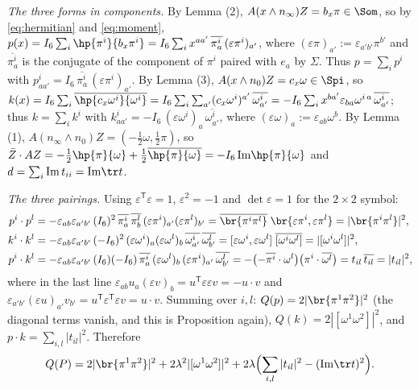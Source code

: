 \emph{The three forms in components.} By Lemma (2), $A(x\wedge n_{\infty})Z = b_{x}\pi \in \Som$, so by \eqref{eq:hermitian} and \eqref{eq:moment}, $p(x) = I_{6}\sum_{i}\hp{\pi^{i}}{b_{x}\pi^{i}} = I_{6}\sum_{i} x^{aa'}\,\overline{\pi^{i}_{a}}\,(\varepsilon\pi^{i})_{a'}$, where $(\varepsilon\pi)_{a'} := \varepsilon_{a'b'}\pi^{b'}$ and $\overline{\pi^{i}_{a}}$ is the conjugate of the component of $\pi^{i}$ paired with $e_{a}$ by $\Sigma$. Thus $p = \sum_{i}p^{i}$ with $p^{i}_{aa'} = I_{6}\,\overline{\pi^{i}_{a}}\,(\varepsilon\pi^{i})_{a'}$. By Lemma (3), $A(x\wedge n_{0})Z = c_{x}\omega \in \Spi$, so $k(x) = I_{6}\sum_{i}\overline{\hp{c_{x}\omega^{i}}{\omega^{i}}} = I_{6}\sum_{i}\sum_{a'}(c_{x}\omega^{i})^{a'}\,\overline{\omega^{i}_{a'}} = -I_{6}\sum_{i}x^{ba'}\varepsilon_{ba}\omega^{i\,a}\,\overline{\omega^{i}_{a'}}$; thus $k = \sum_{i}k^{i}$ with $k^{i}_{aa'} = -I_{6}\,(\varepsilon\omega^{i})_{a}\,\overline{\omega^{i}_{a'}}$, where $(\varepsilon\omega)_{a} := \varepsilon_{ab}\omega^{b}$. By Lemma (1), $A(n_{\infty}\wedge n_{0})Z = (-\tfrac12\omega, \tfrac12\pi)$, so $\bar{Z}\cdot AZ = -\tfrac12\hp{\pi}{\omega} + \tfrac12\overline{\hp{\pi}{\omega}} = -I_{6}\,\mathrm{Im}\hp{\pi}{\omega}$ and $d = \sum_{i}\mathrm{Im}\,t_{ii} = \mathrm{Im}\tr t$.

\emph{The three pairings.} Using $\varepsilon^{\mathsf T}\varepsilon = 1$, $\varepsilon^{2} = -1$ and $\det\varepsilon = 1$ for the $2\times 2$ symbol:
\begin{align*}
p^{i}\cdot p^{l} &= -\varepsilon_{ab}\varepsilon_{a'b'}\,(I_{6})^{2}\,\overline{\pi^{i}_{a}}\,\overline{\pi^{l}_{b}}\,(\varepsilon\pi^{i})_{a'}(\varepsilon\pi^{l})_{b'}
= \overline{\br{\pi^{i}\pi^{l}}}\;\br{\varepsilon\pi^{i},\varepsilon\pi^{l}} = |\br{\pi^{i}\pi^{l}}|^{2},\\
k^{i}\cdot k^{l} &= -\varepsilon_{ab}\varepsilon_{a'b'}\,(-I_{6})^{2}\,(\varepsilon\omega^{i})_{a}(\varepsilon\omega^{l})_{b}\,\overline{\omega^{i}_{a'}}\,\overline{\omega^{l}_{b'}}
= [\varepsilon\omega^{i},\varepsilon\omega^{l}]\;\overline{[\omega^{i}\omega^{l}]} = |[\omega^{i}\omega^{l}]|^{2},\\
p^{i}\cdot k^{l} &= -\varepsilon_{ab}\varepsilon_{a'b'}\,(I_{6})(-I_{6})\,\overline{\pi^{i}_{a}}\,(\varepsilon\omega^{l})_{b}\,(\varepsilon\pi^{i})_{a'}\,\overline{\omega^{l}_{b'}}
= -\bigl(-\overline{\pi^{i}}\cdot\omega^{l}\bigr)\bigl(\pi^{i}\cdot\overline{\omega^{l}}\bigr) = t_{il}\,\overline{t_{il}} = |t_{il}|^{2},
\end{align*}
where in the last line $\varepsilon_{ab}u_{a}(\varepsilon v)_{b} = u^{\mathsf T}\varepsilon\varepsilon v = -u\cdot v$ and $\varepsilon_{a'b'}(\varepsilon u)_{a'}v_{b'} = u^{\mathsf T}\varepsilon^{\mathsf T}\varepsilon v = u\cdot v$. Summing over $i, l$: $Q(p) = 2|\br{\pi^{1}\pi^{2}}|^{2}$ (the diagonal terms vanish, and this is Proposition  again), $Q(k) = 2|[\omega^{1}\omega^{2}]|^{2}$, and $p\cdot k = \sum_{i,l}|t_{il}|^{2}$. Therefore
\[
Q(P) = 2|\br{\pi^{1}\pi^{2}}|^{2} + 2\lambda^{2}|[\omega^{1}\omega^{2}]|^{2} + 2\lambda\Bigl(\sum_{i,l}|t_{il}|^{2} - (\mathrm{Im}\tr t)^{2}\Bigr).
\]

